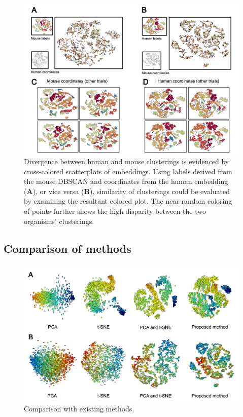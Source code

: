 \documentclass[12pt,oneside,onecolumn,a4paper]{article}
\begin{document}
\begin{figure}[H]
\begin{center}
\includegraphics[width=\columnwidth]{figures/cross_comparison}
\caption{Divergence between human and mouse clusterings is evidenced by cross-colored scatterplots of embeddings. Using labels derived from the mouse DBSCAN and coordinates from the human embedding (\textbf{A}), or vice versa (\textbf{B}), similarity of clusterings could be evaluated by examining the resultant colored plot. The near-random coloring of points further shows the high disparity between the two organisms' clusterings. \label{fig:cross_scatter}%
}
\end{center}
\end{figure}

\subsection{Comparison of methods}

\begin{figure}[H]
\begin{center}
\includegraphics[width=\columnwidth]{figures/dimreduce_comparisons}
\caption{Comparison with existing methods. \label{fig:image_scatter}%
}
\end{center}
\end{figure}
\end{document}
